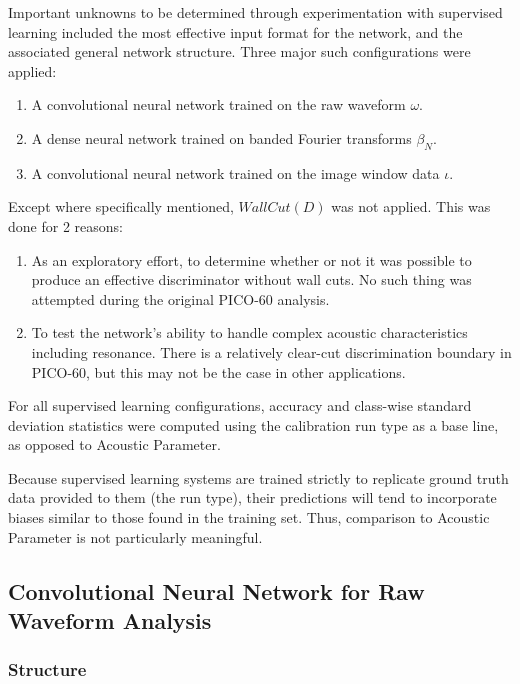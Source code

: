 \documentclass[10pt]{article}
\begin{document}
Important unknowns to be determined through experimentation with supervised learning included the most effective input format for the network, and the associated general network structure. Three major such configurations were applied:

\begin{enumerate}
    \item A convolutional neural network trained on the raw waveform $\omega$.
    \item A dense neural network trained on banded Fourier transforms $\beta_{N}$.
    \item A convolutional neural network trained on the image window data $\iota$.
\end{enumerate}

Except where specifically mentioned, $WallCut(D)$ was not applied. This was done for 2 reasons:

\begin{enumerate}
    \item As an exploratory effort, to determine whether or not it was possible to produce an effective discriminator without wall cuts. No such thing was attempted during the original PICO-60 analysis.
    \item To test the network's ability to handle complex acoustic characteristics including resonance. There is a relatively clear-cut discrimination boundary in PICO-60, but this may not be the case in other applications.
\end{enumerate}

For all supervised learning configurations, accuracy and class-wise standard deviation statistics were computed using the calibration run type as a base line, as opposed to Acoustic Parameter.

Because supervised learning systems are trained strictly to replicate ground truth data provided to them (the run type), their predictions will tend to incorporate biases similar to those found in the training set. Thus, comparison to Acoustic Parameter is not particularly meaningful.

\subsection{Convolutional Neural Network for Raw Waveform Analysis}

\subsubsection{Structure}
\end{document}
